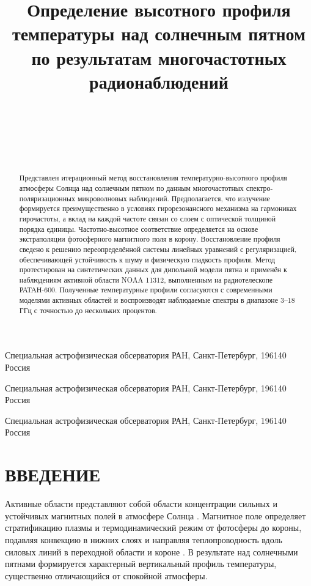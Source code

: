 \documentclass[
 aps, pra,
 amsmath,amssymb,
 11pt,
 final,
tightenlines,
 twoside,
 twocolumn,
 nofloats,
nofootinbib,
 superscriptaddress,
showkeys,
showkeywords,
 ]
{revtex4-2}
\newcommand{\as}[1]{{\color{blue} #1}}
\newcommand{\asrem}[1]{{#1}}
\newcommand{\asnote}[1]{\textbf{\textit{\color{blue} NB! #1}}}
\newcommand{\sao}{Специальная \asrem{астрофизическая} обсерватория
	РАН, Санкт-Петербург, 196140 Россия}
\begin{document}


\title{\as{Определение высотного профиля температуры над солнечным пятном по результатам многочастотных радионаблюдений}}

\author{~}
 \affiliation \sao

\author{~}
 \affiliation \sao

\author{~}
 \affiliation \sao

\begin{abstract}
Представлен итерационный метод восстановления температурно-высотного профиля атмосферы Солнца над солнечным пятном по данным многочастотных спектро-поляризационных микроволновых наблюдений. Предполагается, что излучение формируется преимущественно в условиях гирорезонансного механизма на гармониках гирочастоты, а вклад на каждой частоте связан со слоем с оптической толщиной порядка единицы. Частотно-высотное соответствие определяется на основе экстраполяции фотосферного магнитного поля в корону. Восстановление профиля сведено к решению переопределённой системы линейных уравнений с регуляризацией, обеспечивающей устойчивость к шуму и физическую гладкость профиля. Метод протестирован на синтетических данных для дипольной модели пятна и применён к наблюдениям активной области NOAA 11312, выполненным на радиотелескопе РАТАН-600. Полученные температурные профили согласуются с современными моделями активных областей и воспроизводят наблюдаемые спектры в диапазоне 3–18 ГГц с точностью до нескольких процентов.
\end{abstract}

\maketitle

\section{ВВЕДЕНИЕ}


Активные области представляют собой области концентрации сильных и устойчивых магнитных полей в атмосфере Солнца \citep{Solanki2003}. Магнитное поле определяет стратификацию плазмы и термодинамический режим от фотосферы до короны, подавляя конвекцию в нижних слоях и направляя теплопроводность вдоль силовых линий в переходной области и короне \citep{Solanki2006,Borrero2011}. В результате над солнечными пятнами формируется характерный вертикальный профиль температуры, существенно отличающийся от спокойной атмосферы.
\end{document}
